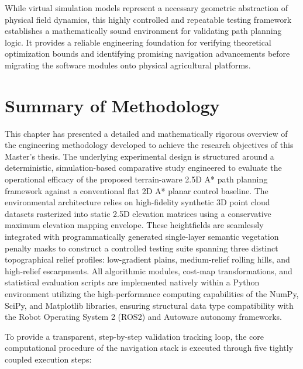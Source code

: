 While virtual simulation models represent a necessary geometric abstraction of physical field
dynamics, this highly controlled and repeatable testing framework establishes a mathematically sound
environment for validating path planning logic. It provides a reliable engineering foundation for
verifying theoretical optimization bounds and identifying promising navigation advancements before
migrating the software modules onto physical agricultural platforms.

\section{Summary of Methodology}

This chapter has presented a detailed and mathematically rigorous overview of the engineering
methodology developed to achieve the research objectives of this Master's thesis. The underlying
experimental design is structured around a deterministic, simulation-based comparative study
engineered to evaluate the operational efficacy of the proposed terrain-aware 2.5D A* path planning
framework against a conventional flat 2D A* planar control baseline. The environmental architecture
relies on high-fidelity synthetic 3D point cloud datasets rasterized into static 2.5D elevation
matrices using a conservative maximum elevation mapping envelope. These heightfields are seamlessly
integrated with programmatically generated single-layer semantic vegetation penalty masks to
construct a controlled testing suite spanning three distinct topographical relief profiles:
low-gradient plains, medium-relief rolling hills, and high-relief escarpments. All algorithmic
modules, cost-map transformations, and statistical evaluation scripts are implemented natively
within a Python environment utilizing the high-performance computing capabilities of the NumPy,
SciPy, and Matplotlib libraries, ensuring structural data type compatibility with the Robot
Operating System 2 (ROS2) and Autoware autonomy frameworks.

To provide a transparent, step-by-step validation tracking loop, the core computational procedure of
the navigation stack is executed through five tightly coupled execution steps:

